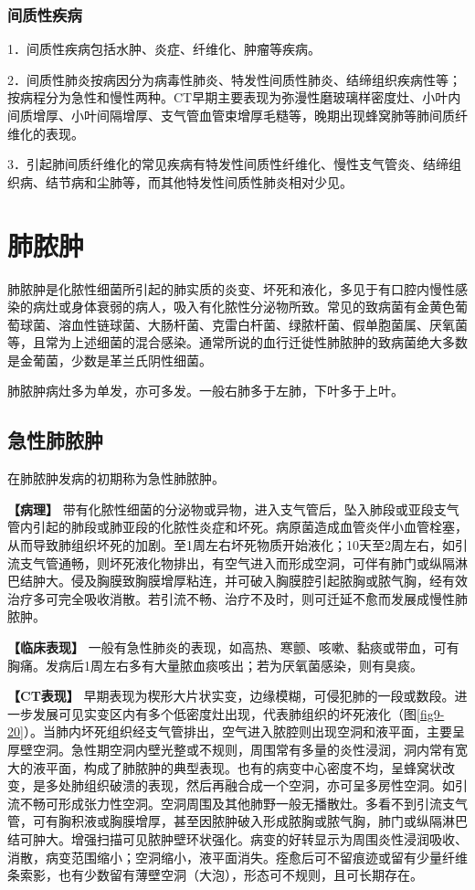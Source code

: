 \subsubsection{间质性疾病}

1．间质性疾病包括水肿、炎症、纤维化、肿瘤等疾病。

2．间质性肺炎按病因分为病毒性肺炎、特发性间质性肺炎、结缔组织疾病性等；按病程分为急性和慢性两种。CT早期主要表现为弥漫性磨玻璃样密度灶、小叶内间质增厚、小叶间隔增厚、支气管血管束增厚毛糙等，晚期出现蜂窝肺等肺间质纤维化的表现。

3．引起肺间质纤维化的常见疾病有特发性间质性纤维化、慢性支气管炎、结缔组织病、结节病和尘肺等，而其他特发性间质性肺炎相对少见。

\section{肺脓肿}

肺脓肿是化脓性细菌所引起的肺实质的炎变、坏死和液化，多见于有口腔内慢性感染的病灶或身体衰弱的病人，吸入有化脓性分泌物所致。常见的致病菌有金黄色葡萄球菌、溶血性链球菌、大肠杆菌、克雷白杆菌、绿脓杆菌、假单胞菌属、厌氧菌等，且常为上述细菌的混合感染。通常所说的血行迁徙性肺脓肿的致病菌绝大多数是金葡菌，少数是革兰氏阴性细菌。

肺脓肿病灶多为单发，亦可多发。一般右肺多于左肺，下叶多于上叶。

\subsection{急性肺脓肿}

在肺脓肿发病的初期称为急性肺脓肿。

\textbf{【病理】}
带有化脓性细菌的分泌物或异物，进入支气管后，坠入肺段或亚段支气管内引起的肺段或肺亚段的化脓性炎症和坏死。病原菌造成血管炎伴小血管栓塞，从而导致肺组织坏死的加剧。至1周左右坏死物质开始液化；10天至2周左右，如引流支气管通畅，则坏死液化物排出，有空气进入而形成空洞，可伴有肺门或纵隔淋巴结肿大。侵及胸膜致胸膜增厚粘连，并可破入胸膜腔引起脓胸或脓气胸，经有效治疗多可完全吸收消散。若引流不畅、治疗不及时，则可迁延不愈而发展成慢性肺脓肿。

\textbf{【临床表现】}
一般有急性肺炎的表现，如高热、寒颤、咳嗽、黏痰或带血，可有胸痛。发病后1周左右多有大量脓血痰咳出；若为厌氧菌感染，则有臭痰。

\textbf{【CT表现】}
早期表现为楔形大片状实变，边缘模糊，可侵犯肺的一段或数段。进一步发展可见实变区内有多个低密度灶出现，代表肺组织的坏死液化（图\ref{fig9-20}）。当肺内坏死组织经支气管排出，空气进入脓腔则出现空洞和液平面，主要呈厚壁空洞。急性期空洞内壁光整或不规则，周围常有多量的炎性浸润，洞内常有宽大的液平面，构成了肺脓肿的典型表现。也有的病变中心密度不均，呈蜂窝状改变，是多处肺组织破溃的表现，然后再融合成一个空洞，亦可呈多房性空洞。如引流不畅可形成张力性空洞。空洞周围及其他肺野一般无播散灶。多看不到引流支气管，可有胸积液或胸膜增厚，甚至因脓肿破入形成脓胸或脓气胸，肺门或纵隔淋巴结可肿大。增强扫描可见脓肿壁环状强化。病变的好转显示为周围炎性浸润吸收、消散，病变范围缩小；空洞缩小，液平面消失。痊愈后可不留痕迹或留有少量纤维条索影，也有少数留有薄壁空洞（大泡），形态可不规则，且可长期存在。

